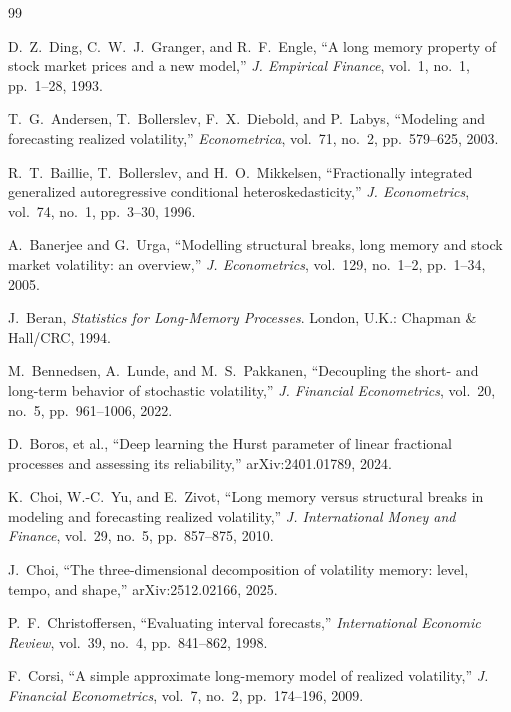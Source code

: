 \documentclass[journal]{IEEEtran}
\begin{document}
\begin{thebibliography}{99}

D.~Z.~Ding, C.~W.~J.~Granger, and R.~F.~Engle, ``A long memory property of stock market prices
and a new model,'' \textit{J. Empirical Finance}, vol.~1, no.~1, pp.~1--28, 1993.

T.~G.~Andersen, T.~Bollerslev, F.~X.~Diebold, and P.~Labys, ``Modeling and forecasting
realized volatility,'' \textit{Econometrica}, vol.~71, no.~2, pp.~579--625, 2003.

R.~T.~Baillie, T.~Bollerslev, and H.~O.~Mikkelsen, ``Fractionally integrated generalized
autoregressive conditional heteroskedasticity,'' \textit{J. Econometrics}, vol.~74, no.~1,
pp.~3--30, 1996.

A.~Banerjee and G.~Urga, ``Modelling structural breaks, long memory and stock market
volatility: an overview,'' \textit{J. Econometrics}, vol.~129, no.~1--2, pp.~1--34, 2005.

J.~Beran, \textit{Statistics for Long-Memory Processes}. London, U.K.: Chapman \& Hall/CRC, 1994.

M.~Bennedsen, A.~Lunde, and M.~S.~Pakkanen, ``Decoupling the short- and long-term behavior of
stochastic volatility,'' \textit{J. Financial Econometrics}, vol.~20, no.~5, pp.~961--1006, 2022.

D.~Boros, et al., ``Deep learning the Hurst parameter of linear fractional processes and
assessing its reliability,'' arXiv:2401.01789, 2024.

K.~Choi, W.-C.~Yu, and E.~Zivot, ``Long memory versus structural breaks in modeling and
forecasting realized volatility,'' \textit{J. International Money and Finance}, vol.~29, no.~5,
pp.~857--875, 2010.

J.~Choi, ``The three-dimensional decomposition of volatility memory: level, tempo, and shape,''
arXiv:2512.02166, 2025.

P.~F.~Christoffersen, ``Evaluating interval forecasts,'' \textit{International Economic Review},
vol.~39, no.~4, pp.~841--862, 1998.

F.~Corsi, ``A simple approximate long-memory model of realized volatility,'' \textit{J. Financial
Econometrics}, vol.~7, no.~2, pp.~174--196, 2009.


\end{thebibliography}
\end{document}
